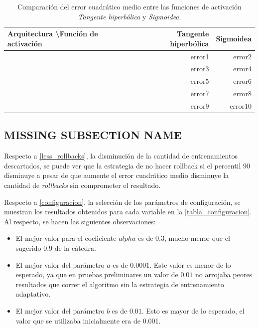 \documentclass[a4paper,10pt]{article}
\begin{document}
     \begin{table}[H]
        \label{table-comparation-act-functions}

        \begin{center}
        \begin{tabular}{|l|r|r|}
            \hline
            Arquitectura \textbackslash Función de activación & Tangente hiperbólica & Sigmoidea \\
            \hline
            [2 5 4 1] & error1 & error2 \\
            \hline
            [3 10 6 1] & error3 & error4  \\
            \hline
            [2 10 6 1] & error5 & error6  \\
            \hline
            [2 4 2 1]  & error7 & error8  \\
            \hline
            [3 14 8 1] & error9 & error10  \\
            \hline
        \end{tabular}
        \end{center}
        \caption{Comparación del error cuadrático medio entre las funciones de activación \textit{Tangente hiperbólica} y \textit{Sigmoidea}.}


    \end{table}

    \subsection{MISSING SUBSECTION NAME}
        Respecto a \ref{less_rollbacks}, la disminución de la cantidad de entrenamientos descartados, se puede ver que la estrategia de no hacer rollback 
        si el percentil 90 disminuye a pesar de que aumente el error cuadrático medio disminuye la cantidad de \textit{rollbacks} sin comprometer el resultado.

        Respecto a \ref{configuracion}, la selección de los parámetros de configuración, se muestran los resultados obtenidos para cada variable en la \ref{tabla_configuracion}. 
        Al respecto, se hacen las siguientes observaciones:

        \begin{itemize}
        \item El mejor valor para el coeficiente $alpha$ es de $0.3$, mucho menor que el sugerido $0.9$ de la cátedra.
        \item El mejor valor del parámetro $a$ es de $0.0001$. Este valor es menor de lo esperado, ya que en pruebas preliminares un valor de $0.01$ 
              no arrojaba peores resultados que correr el algoritmo sin la estrategia de entrenamiento adaptativo.
        \item El mejor valor del parámetro $b$ es de $0.01$. Esto es mayor de lo esperado, el valor que se utilizaba inicialmente era de 0.001.
        \end{itemize}
\end{document}

